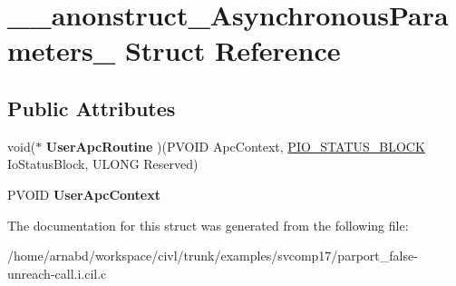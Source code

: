 \hypertarget{struct____anonstruct__AsynchronousParameters__46}{}\section{\+\_\+\+\_\+anonstruct\+\_\+\+Asynchronous\+Parameters\+\_ Struct Reference}
\label{struct____anonstruct__AsynchronousParameters__46}
\subsection*{Public Attributes}
\begin{DoxyCompactItemize}
\item 
\hypertarget{struct____anonstruct__AsynchronousParameters__46_ac2e2d5a075ea4a30ea50fbf7c4dfa67e}{}void($\ast$ {\bfseries User\+Apc\+Routine} )(P\+V\+O\+I\+D Apc\+Context, \hyperlink{struct__IO__STATUS__BLOCK}{P\+I\+O\+\_\+\+S\+T\+A\+T\+U\+S\+\_\+\+B\+L\+O\+C\+K} Io\+Status\+Block, U\+L\+O\+N\+G Reserved)\label{struct____anonstruct__AsynchronousParameters__46_ac2e2d5a075ea4a30ea50fbf7c4dfa67e}

\item 
\hypertarget{struct____anonstruct__AsynchronousParameters__46_a17269b87b6accfa0f1e0f3b42570905f}{}P\+V\+O\+I\+D {\bfseries User\+Apc\+Context}\label{struct____anonstruct__AsynchronousParameters__46_a17269b87b6accfa0f1e0f3b42570905f}

\end{DoxyCompactItemize}


The documentation for this struct was generated from the following file\+:\begin{DoxyCompactItemize}
\item 
/home/arnabd/workspace/civl/trunk/examples/svcomp17/parport\+\_\+false-\/unreach-\/call.\+i.\+cil.\+c\end{DoxyCompactItemize}
